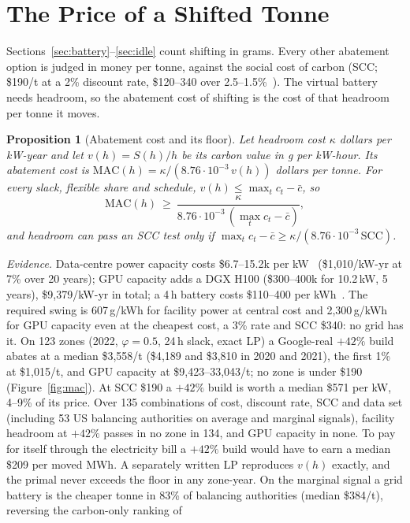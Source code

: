 \documentclass[acmsmall,review,anonymous]{acmart}
\newtheorem{proposition}[theorem]{Proposition}
\theoremstyle{definition}
\begin{document}
\section{The Price of a Shifted Tonne}
\label{sec:mac}
Sections~\ref{sec:battery}--\ref{sec:idle} count shifting in grams. Every other abatement
option is judged in money per tonne, against the social cost of carbon (SCC; \$190/t at a 2\%
discount rate, \$120--340 over 2.5--1.5\%~\cite{agency2023report}). The virtual battery needs
headroom, so the abatement cost of shifting is the cost of that headroom per tonne it moves.
\begin{proposition}[Abatement cost and its floor]\label{prop:mac}
Let headroom cost $\kappa$ dollars per kW-year and let $v(h)=S(h)/h$ be its carbon value in g per
kW-hour. Its abatement cost is $\mathrm{MAC}(h)=\kappa/(8.76\cdot10^{-3}\,v(h))$ dollars per
tonne. For every slack, flexible share and schedule, $v(h)\le\max_tc_t-\bar c$, so
\[ \mathrm{MAC}(h)\ \ge\ \frac{\kappa}{8.76\cdot10^{-3}\,(\max_tc_t-\bar c)}, \]
and headroom can pass an SCC test only if $\max_tc_t-\bar c\ge\kappa/(8.76\cdot10^{-3}\,\mathrm{SCC})$.
\end{proposition}
\emph{Evidence.} Data-centre power capacity costs \$6.7--15.2k per kW~\cite{turner2025data}
(\$1{,}010/kW-yr at 7\% over 20 years); GPU capacity adds a DGX H100 (\$300--400k for 10.2\,kW,
5 years), \$9{,}379/kW-yr in total; a 4\,h battery costs \$110--400 per kWh~\cite{finance2025energy}.
The required swing is 607\,g/kWh for facility power at central cost and 2{,}300\,g/kWh for GPU
capacity even at the cheapest cost, a 3\% rate and SCC \$340: no grid has it. On 123 zones
(2022, $\varphi=0.5$, 24\,h slack, exact LP) a Google-real $+42\%$ build abates at a median
\$3{,}558/t (\$4{,}189 and \$3{,}810 in 2020 and 2021), the first 1\% at \$1{,}015/t, and GPU
capacity at \$9{,}423--33{,}043/t; no zone is under \$190 (Figure~\ref{fig:mac}). At SCC \$190 a
$+42\%$ build is worth a median \$571 per kW, 4--9\% of its price. Over 135 combinations of cost,
discount rate, SCC and data set (including 53 US balancing authorities on average and marginal
signals), facility headroom at $+42\%$ passes in no zone in 134, and GPU capacity in none. To pay
for itself through the electricity bill a $+42\%$ build would have to earn a median \$209 per
moved MWh. A separately written LP reproduces $v(h)$ exactly, and the primal never exceeds the
floor in any zone-year. On the marginal signal a grid battery is the cheaper tonne in 83\% of
balancing authorities (median \$384/t), reversing the carbon-only ranking of
\end{document}
